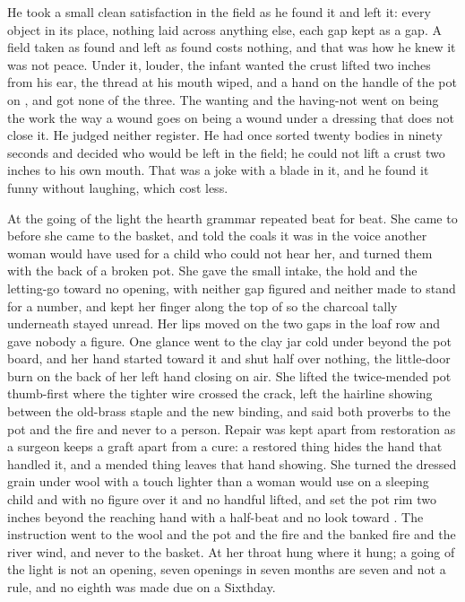 He took a small clean satisfaction in the field as he found it and left it: every object in its place, nothing laid across anything else, each gap kept as a gap. A field taken as found and left as found costs nothing, and that was how he knew it was not peace. Under it, louder, the infant wanted the crust lifted two inches from his ear, the thread at his mouth wiped, and a hand on the handle of the pot on , and got none of the three. The wanting and the having-not went on being the work the way a wound goes on being a wound under a dressing that does not close it. He judged neither register. He had once sorted twenty bodies in ninety seconds and decided who would be left in the field; he could not lift a crust two inches to his own mouth. That was a joke with a blade in it, and he found it funny without laughing, which cost less.

\scenebreak

At the going of the light the hearth grammar repeated beat for beat. She came to  before she came to the basket, and told the coals it was  in the voice another woman would have used for a child who could not hear her, and turned them with the back of a broken pot. She gave the small intake, the hold and the letting-go toward no opening, with neither gap figured and neither made to stand for a number, and kept her finger along the top of  so the charcoal tally underneath stayed unread. Her lips moved on the two gaps in the loaf row and gave nobody a figure. One glance went to the clay jar cold under  beyond the pot board, and her hand started toward it and shut half over nothing, the little-door burn on the back of her left hand closing on air. She lifted the twice-mended pot thumb-first where the tighter wire crossed the crack, left the hairline showing between the old-brass staple and the new binding, and said both proverbs to the pot and the fire and never to a person. Repair was kept apart from restoration as a surgeon keeps a graft apart from a cure: a restored thing hides the hand that handled it, and a mended thing leaves that hand showing. She turned the dressed grain under wool with a touch lighter than a woman would use on a sleeping child and with no figure over it and no handful lifted, and set the pot rim two inches beyond the reaching hand with a half-beat and no look toward . The instruction went to the wool and the pot and the fire and the banked fire and the river wind, and never to the basket. At her throat  hung where it hung; a going of the light is not an opening, seven openings in seven months are seven and not a rule, and no eighth was made due on a Sixthday.

